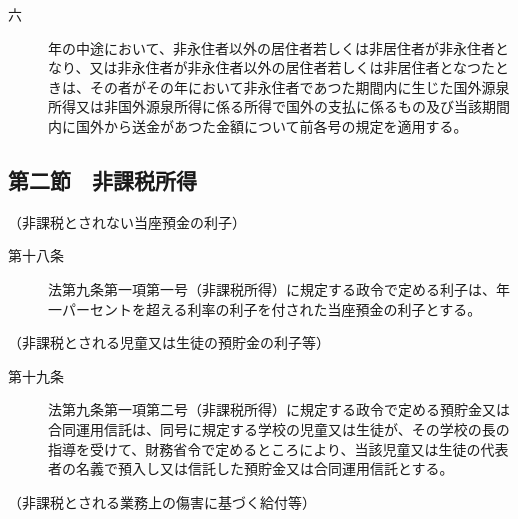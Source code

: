 \documentclass[twocolumn,a4j,10pt]{ltjtarticle}
\begin{document}
\begin{description}
\begin{description}
\item[六]年の中途において、非永住者以外の居住者若しくは非居住者が非永住者となり、又は非永住者が非永住者以外の居住者若しくは非居住者となつたときは、その者がその年において非永住者であつた期間内に生じた国外源泉所得又は非国外源泉所得に係る所得で国外の支払に係るもの及び当該期間内に国外から送金があつた金額について前各号の規定を適用する。
\end{description}
\end{description}
\subsection*{第二節　非課税所得}
\noindent\hspace{10pt}（非課税とされない当座預金の利子）
\begin{description}
\item[第十八条]法第九条第一項第一号（非課税所得）に規定する政令で定める利子は、年一パーセントを超える利率の利子を付された当座預金の利子とする。
\end{description}
\noindent\hspace{10pt}（非課税とされる児童又は生徒の預貯金の利子等）
\begin{description}
\item[第十九条]法第九条第一項第二号（非課税所得）に規定する政令で定める預貯金又は合同運用信託は、同号に規定する学校の児童又は生徒が、その学校の長の指導を受けて、財務省令で定めるところにより、当該児童又は生徒の代表者の名義で預入し又は信託した預貯金又は合同運用信託とする。
\end{description}
\noindent\hspace{10pt}（非課税とされる業務上の傷害に基づく給付等）
\end{document}
